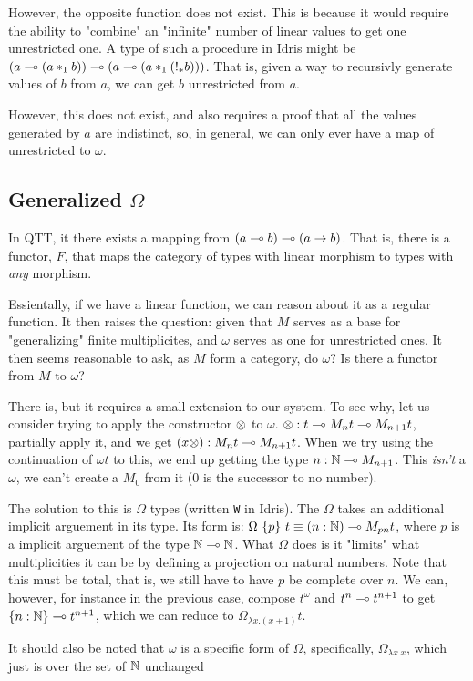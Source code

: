 However, the opposite function does not exist. 
This is because it would require the ability to "combine" an "infinite" number of linear values to get one unrestricted one. 
A type of such a procedure in Idris might be $(a \multimap (a *_1 b)) \multimap (a \multimap (a *_1 (!_* b)))$. 
That is, given a way to recursivly generate values of $b$ from $a$, we can get $b$ unrestricted from $a$.

However, this does not exist, and also requires a proof that all the values generated by $a$ are indistinct, so, in general, we can only ever have a map of unrestricted to $\omega$.

\subsection{Generalized $\Omega$}

In QTT, it there exists a mapping from $(a \multimap b) \multimap (a \to b)$. 
That is, there is a functor, $F$, that maps the category of types with linear morphism to types with \emph{any} morphism.

Essientally, if we have a linear function, we can reason about it as a regular function.
It then raises the question: given that $M$ serves as a base for "generalizing" finite multiplicites, and $\omega$ serves as one for unrestricted ones. 
It then seems reasonable to ask, as $M$ form a category, do $\omega$? 
Is there a functor from $M$ to $\omega$?

There is, but it requires a small extension to our system.
To see why, let us consider trying to apply the constructor $\otimes$ to $\omega$. 
$\otimes : t \multimap M_n t \multimap M_{n + 1} t$, partially apply it, and we get $(x \otimes) : M_n t \multimap M_{n+1} t$.
When we try using the continuation of $\omega t$ to this, we end up getting the type ${n : \mathbb{N}} \multimap M_{n+1}$. 
This \emph{isn't} a $\omega$, we can't create a $M_0$ from it ($0$ is the successor to no number).

The solution to this is $\Omega$ types (written \verb|W| in Idris). 
The $\Omega$ takes an additional implicit arguement in its type.
Its form is: $\Omega \ \{p\} \ t \equiv (n : \mathbb{N}) \multimap M_{p n} t$, where $p$ is a implicit arguement of the type $\mathbb{N} \multimap \mathbb{N}$. 
What $\Omega$ does is it "limits" what multiplicities it can be by defining a projection on natural numbers. 
Note that this must be total, that is, we still have to have $p$ be complete over $n$. 
We can, however, for instance in the previous case, compose $t^\omega$ and $t^n \multimap t^{n + 1}$ to get $\{n : \mathbb{N}\} \multimap t^{n + 1}$, which we can reduce to $\Omega_{\lambda x . (x + 1)} t$.

It should also be noted that $\omega$ is a specific form of $\Omega$, specifically, $\Omega_{\lambda x . x}$, which just is over the set of $\mathbb{N}$ unchanged

